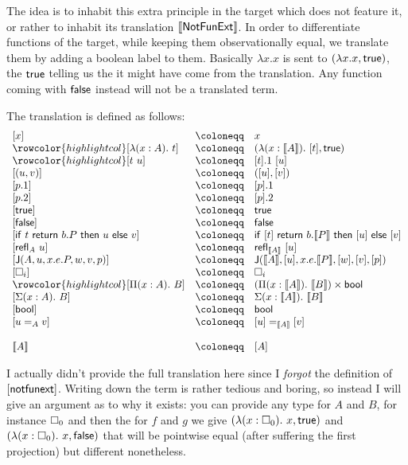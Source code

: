 The idea is to inhabit this extra principle in the target which does not feature
it, or rather to inhabit its translation \(\llbracket \mathsf{NotFunExt} \rrbracket\).
In order to differentiate functions of the target, while keeping them
observationally equal, we translate them by adding a boolean label to them.
Basically \(\lambda x. x\) is sent to \((\lambda x. x, \mathsf{true})\), the \(\mathsf{true}\)
telling us the it might have come from the translation. Any function coming with
\(\mathsf{false}\) instead will not be a translated term.

The translation is defined as follows:
%
\[
\begin{array}{lcl}
  [ x ] &\coloneqq& x \\
  \rowcolor{highlightcol} \relax
  [ \lambda (x : A).\ t ] &\coloneqq& (\lambda (x : \transl{A}).\ [t],\ttrue) \\
  \rowcolor{highlightcol} \relax
  [ t\ u ] &\coloneqq& [t].1\ [u] \\ \relax
  [ (u, v) ] &\coloneqq& ([u], [v]) \\ \relax
  [ p.1 ] &\coloneqq& [p].1 \\ \relax
  [ p.2 ] &\coloneqq& [p].2 \\ \relax
  [ \ttrue ] &\coloneqq& \ttrue \\ \relax
  [ \ffalse ] &\coloneqq& \ffalse \\ \relax
  [ \tif{t}{b. P}{u}{v} ] &\coloneqq& \tif{[t]}{b. \transl{P}}{[u]}{[v]} \\
  \relax
  [ \refl{A} u ] &\coloneqq& \refl{\transl{A}} [u] \\ \relax
  [ \J{A}{u}{x.e.P}{w}{v}{p} ] &\coloneqq&
  \J{\transl{A}}{[u]}{x.e.\transl{P}}{[w]}{[v]}{[p]} \\ \relax
  [ \Ty{i} ] &\coloneqq& \Ty{i} \\
  \rowcolor{highlightcol} \relax
  [ \Pi (x : A).\ B ] &\coloneqq&
  (\Pi (x : \transl{A}).\ \transl{B}) \times \bool \\ \relax
  [ \Sigma (x : A).\ B ] &\coloneqq& \Sigma (x:\transl{A}).\ \transl{B} \\
  \relax
  [ \bool ] &\coloneqq& \bool \\ \relax
  [ u =_A v ] &\coloneqq& [u] =_{\transl{A}} [v] \\ \relax
  \\
  \transl{A} &\coloneqq& [A]
\end{array}
\]

I actually didn't provide the full translation here since I \emph{forgot}
the definition of \([\mathsf{notfunext}]\).
Writing down the term is rather tedious and boring, so instead I will give an
argument as to why it exists: you can provide any type for \(A\) and \(B\), for
instance \(\square_{0}\) and then the for \(f\) and \(g\) we give
\((\lambda (x:\square_{0}).\ x, \mathsf{true})\) and
\((\lambda (x:\square_{0}).\ x, \mathsf{false})\) that will be pointwise equal (after
suffering the first projection) but different nonetheless.

